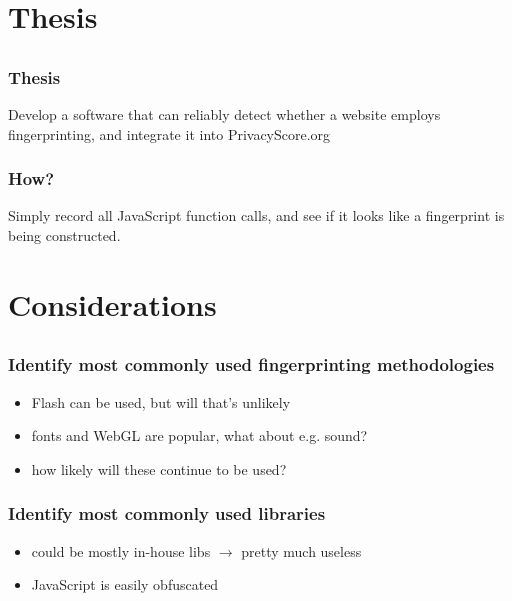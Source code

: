 \documentclass{beamer}
\begin{document}

\section{Thesis}
\subsection{}


\begin{frame}
    \frametitle{Thesis}
    Develop a software that can reliably detect whether a website employs fingerprinting,
    and integrate it into PrivacyScore.org
\end{frame}


\begin{frame}
    \frametitle{How?}
    Simply record all JavaScript function calls, and see if it looks like a fingerprint is being
    constructed.
\end{frame}


\section{Considerations}
\subsection{}


\begin{frame}
    \frametitle{Identify most commonly used fingerprinting methodologies}
    \begin{itemize}
        \item Flash can be used, but will that's unlikely
        \item fonts and WebGL are popular, what about e.g. sound?
        \item how likely will these continue to be used?
    \end{itemize}
\end{frame}


\begin{frame}
    \frametitle{Identify most commonly used libraries}
    \begin{itemize}
        \item could be mostly in-house libs $\rightarrow$ pretty much useless
        \item JavaScript is easily obfuscated
    \end{itemize}
    
\end{frame}
\end{document}
